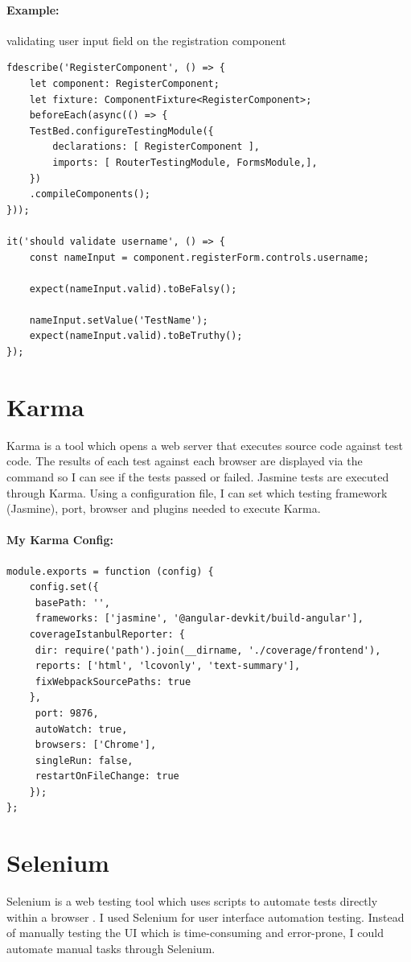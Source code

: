 \paragraph{Example:} validating user input field on the registration component
\begin{verbatim}
fdescribe('RegisterComponent', () => {
	let component: RegisterComponent;
	let fixture: ComponentFixture<RegisterComponent>;	
	beforeEach(async(() => {
	TestBed.configureTestingModule({
		declarations: [ RegisterComponent ],
		imports: [ RouterTestingModule, FormsModule,],
	})
	.compileComponents();
}));

it('should validate username', () => {
	const nameInput = component.registerForm.controls.username;
	
	expect(nameInput.valid).toBeFalsy();
	
	nameInput.setValue('TestName');
	expect(nameInput.valid).toBeTruthy();
});

\end{verbatim}
 
\section{Karma}
Karma \cite{karmatesting} is a tool which opens a web server that executes source code against test code. The results of each test against each browser are displayed via the command so I can see if the tests passed or failed. Jasmine tests are executed through Karma. Using a configuration file, I can set which testing framework (Jasmine), port, browser and plugins needed to execute Karma.
\paragraph{My Karma Config:}
\begin{verbatim}
module.exports = function (config) {
	config.set({
	 basePath: '',
	 frameworks: ['jasmine', '@angular-devkit/build-angular'],
	coverageIstanbulReporter: {
	 dir: require('path').join(__dirname, './coverage/frontend'),
	 reports: ['html', 'lcovonly', 'text-summary'],
	 fixWebpackSourcePaths: true
	},
	 port: 9876,
	 autoWatch: true,
	 browsers: ['Chrome'],
	 singleRun: false,
	 restartOnFileChange: true
	});
};

\end{verbatim}

\section{Selenium}
Selenium is a web testing tool which uses scripts to automate tests directly within a browser \cite{holmes2006automating}. I used Selenium for user interface automation testing. Instead of manually testing the UI which is time-consuming and error-prone, I could automate manual tasks through Selenium.

